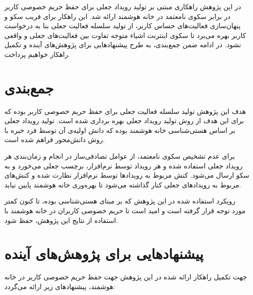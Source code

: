 
در این پژوهش راهکاری مبتنی بر تولید رویداد جعلی برای حفظ حریم خصوصی کاربر در برابر سکوی نامعتمد در خانه هوشمند ارائه شد. این راهکار برای فریب سکو و پنهان‌سازی فعالیت‌های حساس کاربر، از تولید سلسله فعالیت جعلی بنا به درخواست کاربر بهره می‌برد تا سکوی اینترنت اشیاء متوجه تفاوت بین فعالیت‌های جعلی و واقعی نشود. در ادامه ضمن جمع‌بندی، به طرح پیشنهادهایی برای پژوهش‌های آینده و تکمیل راهکار خواهیم پرداخت.

\section{جمع‌بندی}

هدف این پژوهش تولید سلسله فعالیت جعلی برای حفظ حریم خصوصی کاربر بوده که برای این هدف از روش تولید رویداد جعلی بهره برداری شده است. تولید رویداد جعلی بر اساس هستی‌شناسی خانه هوشمند بوده که دانش اولیه‌ی آن توسط فرد خبره با روش دانش‌محور فراهم شده است.

برای عدم تشخیص سکوی نامعتمد، از عوامل تصادفی‌ساز در انجام و زمان‌بندی هر رویداد جعلی استفاده شده و هر رویداد توسط نرم‌افزار، برچسب جعلی می‌خورد و به سکو ارسال می‌شود. کنش مربوط به رویدادها توسط نرم‌افزار نظارت شده و کنش‌های مربوط به رویدادهای جعلی کنار گذاشته می‌شود تا بهره‌وری خانه هوشمند پایین نیاید.

رویکرد استفاده شده در این پژوهش که بر مبنای هستی‌شناسی بوده، تا کنون کمتر مورد توجه قرار گرفته است و امید است تا حریم خصوصی کاربران در خانه هوشمند با استفاده از نتایج این پژوهش، حفظ شود.

\section{پیشنهادهایی برای پژوهش‌های آینده}

جهت تکمیل راهکار ارائه شده در این پژوهش جهت حفظ حریم خصوصی کاربر در خانه هوشمند، پیشنهادهای زیر ارائه می‌گردد:

